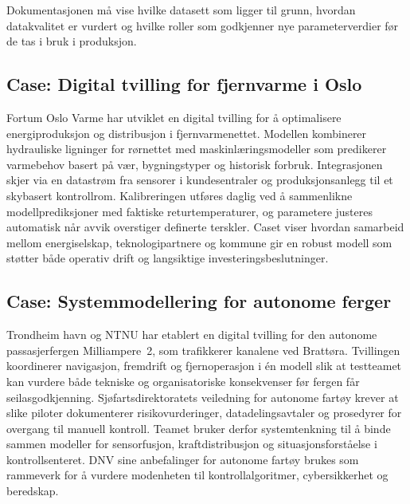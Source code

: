 Dokumentasjonen må vise hvilke datasett som ligger til grunn, hvordan datakvalitet er vurdert og hvilke roller som godkjenner nye
parameterverdier før de tas i bruk i produksjon.

\subsection{Case: Digital tvilling for fjernvarme i Oslo}
Fortum Oslo Varme har utviklet en digital tvilling for å optimalisere energiproduksjon og distribusjon i fjernvarmenettet.
Modellen kombinerer hydrauliske ligninger for rørnettet med maskinlæringsmodeller som predikerer varmebehov basert på vær,
bygningstyper og historisk forbruk. Integrasjonen skjer via en datastrøm fra sensorer i kundesentraler og produksjonsanlegg til
et skybasert kontrollrom. Kalibreringen utføres daglig ved å sammenlikne modellprediksjoner med faktiske returtemperaturer, og
parametere justeres automatisk når avvik overstiger definerte terskler. Caset viser hvordan samarbeid mellom energiselskap,
teknologipartnere og kommune gir en robust modell som støtter både operativ drift og langsiktige investeringsbeslutninger.

\subsection{Case: Systemmodellering for autonome ferger}
Trondheim havn og NTNU har etablert en digital tvilling for den autonome passasjerfergen Milliampere~2, som trafikkerer kanalene
ved Brattøra.\citep{ntnu2023milliampere2} Tvillingen koordinerer navigasjon, fremdrift og fjernoperasjon i én modell slik at
testteamet kan vurdere både tekniske og organisatoriske konsekvenser før fergen får seilasgodkjenning. Sjøfartsdirektoratets
veiledning for autonome fartøy krever at slike piloter dokumenterer risikovurderinger, datadelingsavtaler og prosedyrer for
overgang til manuell kontroll.\citep{sdir2023autonomefartoy} Teamet bruker derfor systemtenkning til å binde sammen modeller for
sensorfusjon, kraftdistribusjon og situasjonsforståelse i kontrollsenteret. DNV sine anbefalinger for autonome fartøy brukes som
rammeverk for å vurdere modenheten til kontrollalgoritmer, cybersikkerhet og beredskap.\citep{dnv2024autonomous}

